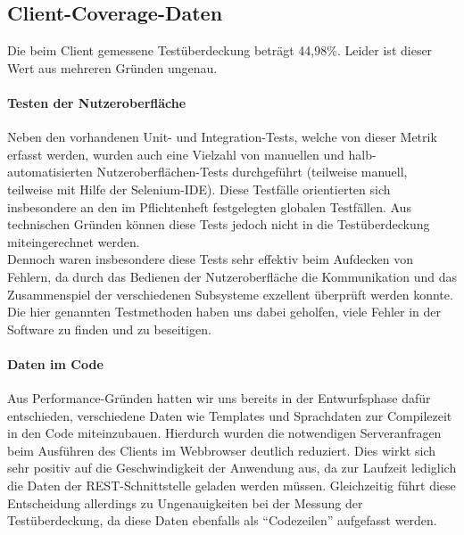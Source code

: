 \FloatBarrier
\subsection{Client-Coverage-Daten}
Die beim Client gemessene Testüberdeckung beträgt 44,98\%. Leider ist dieser Wert aus mehreren Gründen ungenau.
\paragraph{Testen der Nutzeroberfläche}
Neben den vorhandenen Unit- und Integration-Tests, welche von dieser Metrik erfasst werden, wurden auch eine Vielzahl von manuellen und halb-automatisierten Nutzeroberflächen-Tests durchgeführt (teilweise manuell, teilweise mit Hilfe der Selenium-IDE). Diese Testfälle orientierten sich insbesondere an den im Pflichtenheft festgelegten globalen Testfällen. Aus technischen Gründen können diese Tests jedoch nicht in die Testüberdeckung miteingerechnet werden.\\
Dennoch waren insbesondere diese Tests sehr effektiv beim Aufdecken von Fehlern, da durch das Bedienen der Nutzeroberfläche die Kommunikation und das Zusammenspiel der verschiedenen Subsysteme exzellent überprüft werden konnte. Die hier genannten Testmethoden haben uns dabei geholfen, viele Fehler in der Software zu finden und zu beseitigen.
\paragraph{Daten im Code}
Aus Performance-Gründen hatten wir uns bereits in der Entwurfsphase dafür entschieden, verschiedene Daten wie Templates und Sprachdaten zur Compilezeit in den Code miteinzubauen. Hierdurch wurden die notwendigen Serveranfragen beim Ausführen des Clients im Webbrowser deutlich reduziert. Dies wirkt sich sehr positiv auf die Geschwindigkeit der Anwendung aus, da zur Laufzeit lediglich die Daten der REST-Schnittstelle geladen werden müssen. Gleichzeitig führt diese Entscheidung allerdings zu Ungenauigkeiten bei der Messung der Testüberdeckung, da diese Daten ebenfalls als \enquote{Codezeilen} aufgefasst werden.